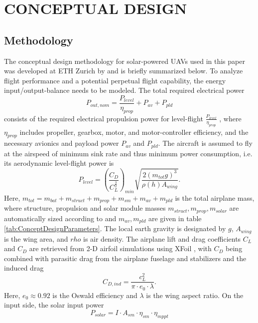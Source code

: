 \section{CONCEPTUAL DESIGN}
\subsection{Methodology} \label{sec:ConceptualDesignMethodology}
The conceptual design methodology for solar-powered UAVs used in this paper was developed at ETH Zurich by \cite{Noth_PhD,Leutenegger_JIRS} and is briefly summarized below. To analyze flight performance and a potential perpetual flight capability, the energy input/output-balance needs to be modeled. The total required electrical power
\begin{equation} \label{eqn:P_out}
P_{out,nom}=\frac{P_{level}}{\eta_{prop}}+P_{av}+P_{pld}
\end{equation}
consists of the required electrical propulsion power for level-flight $\frac{P_{level}}{\eta_{prop}}$ , where $\eta_{prop}$ includes propeller, gearbox, motor, and motor-controller efficiency, and the necessary avionics and payload power $P_{av}$ and $P_{pld}$. The aircraft is assumed to fly at the airspeed of minimum sink rate and thus minimum power consumption, i.e. its aerodynamic level-flight power is
\begin{equation} \label{eqn:P_level}
P_{level}=\left(\frac{C_D}{C_L^\frac{3}{2}}\right)_{min}\sqrt{\frac{2(m_{tot}g)^3}{\rho(h)A_{wing}}} .
\end{equation}
Here, $m_{tot}=m_{bat}+m_{struct}+m_{prop}+m_{sm}+m_{av}+m_{pld}$ is the total airplane mass, where structure, propulsion and solar module masses $m_{struct},m_{prop},m_{solar}$ are automatically sized according to \cite{Noth_PhD,Leutenegger_JIRS} and $m_{av},m_{pld}$ are given in table \ref{tab:ConceptDesignParameters}. The local earth gravity is designated by $g$, $A_{wing}$ is the wing area, and $rho$ is air density. The airplane lift and drag coefficients $C_L$ and $C_D$ are retrieved from 2-D airfoil simulations using XFoil \cite{Drela_XFoil}, with $C_D$ being combined with parasitic drag from the airplane fuselage and stabilizers and the induced drag  
\begin{equation} \label{eqn:C_D}
C_{D,ind}=\frac{c_L^2}{\pi\cdot e_0\cdot\lambda} .
\end{equation}
Here, $e_0\approx0.92$ is the Oswald efficiency and $\lambda$ is the wing aspect ratio. On the input side, the solar input power
\begin{equation} \label{eqn:P_solar}
P_{solar}=I\cdot A_{sm}\cdot\eta_{sm}\cdot\eta_{mppt}
\end{equation}
